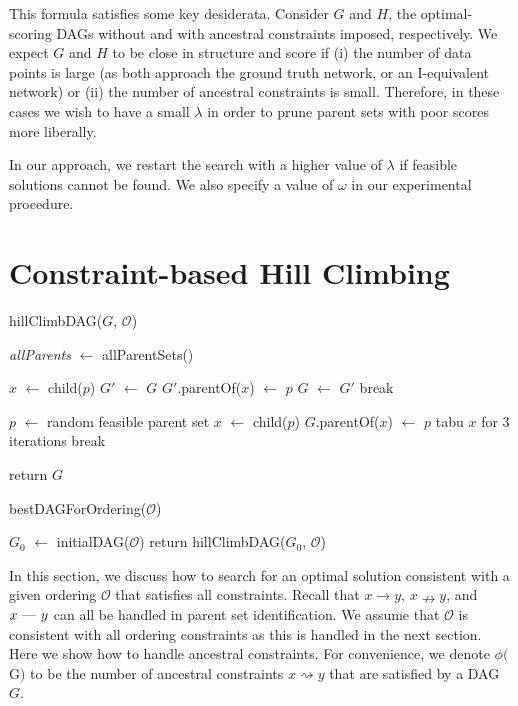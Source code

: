 \documentclass[twoside,11pt]{article}
\begin{document}
\smallskip
This formula satisfies some key desiderata. Consider $G$ and $H$, the optimal-scoring DAGs without and with ancestral constraints imposed, respectively. 
We expect $G$ and $H$ to be close in structure and score if (i) the number of data points is large (as both approach the ground truth network, or an I-equivalent network)
or (ii) the number of ancestral constraints is small. Therefore, in these cases we wish to have a small $\lambda$ in order to prune parent sets with poor scores more liberally.
  
\smallskip
In our approach, we restart the search with a higher value of $\lambda$ if feasible solutions cannot be found. We also specify a value of $\omega$ in our experimental procedure.


\section{Constraint-based Hill Climbing}
\label{SECTION:ConstraintBasedHillClimbing}

\begin{algorithm}[t]
	\caption{hillClimbDAG($G$, $\mathcal{O}$)}
 		\emph{allParents} $\leftarrow$ allParentSets()  
		
		 {
			 {
				$x$ $\leftarrow$ child($p$) \;
				 {
					$G'$ $\leftarrow$ $G$\;
					$G'$.parentOf($x$) $\leftarrow$ $p$ \;
					 {
						$G$ $\leftarrow$ $G'$ \;
						break \;
					}
				}
			}
			
			 {
				 { 
					$p$ $\leftarrow$ random feasible parent set\;
					$x$ $\leftarrow$ child($p$) \;
					$G$.parentOf($x$) $\leftarrow$ $p$ \;
					tabu $x$ for $3$ iterations \;
				}
				 {
					break \;
				}
			}
			
		}
	
	return $G$ \;
\end{algorithm}
\begin{algorithm}[t]
	\caption{bestDAGForOrdering($\mathcal{O}$)}
 		$G_0$ $\leftarrow$ initialDAG($\mathcal{O}$) \;
		return hillClimbDAG($G_0$, $\mathcal{O}$) \;
\end{algorithm}

In this section, we discuss how to search for an optimal solution consistent with a given ordering $\mathcal{O}$ that satisfies all constraints. Recall that  $x \rightarrow y$, $x \nrightarrow y$, and $x \text{ \textemdash \  } y$ can all be handled in parent set identification. We assume that $\mathcal{O}$ is consistent with all ordering constraints as this is handled in the next section. Here we show how to handle ancestral constraints.
For convenience, we denote $\phi($G$)$ to be the number of ancestral constraints $x \rightsquigarrow y$ that are satisfied by a DAG $G$.
\end{document}

